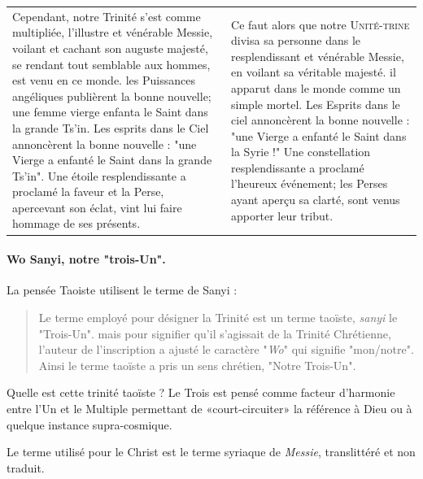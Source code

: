 \begin{tabular}{p{}p{}}
\\
Cependant, notre Trinité s'est comme multipliée, l'illustre et vénérable Messie, voilant et cachant son auguste majesté, se rendant tout semblable aux hommes, est venu en ce monde. les Puissances angéliques publièrent la bonne nouvelle; une femme vierge enfanta le Saint dans la grande Ts'in. Les esprits dans le Ciel annoncèrent la bonne nouvelle : "une Vierge a enfanté le Saint dans la grande Ts'in". Une étoile resplendissante a proclamé la faveur et la Perse, apercevant son éclat, vint lui faire hommage de ses présents. \cite[p. 35]{Havret:stelechretienne} & 

Ce faut alors que notre \textsc{Unité-trine} divisa sa personne dans le resplendissant et vénérable Messie, en voilant sa véritable majesté. il apparut dans le monde comme un simple mortel. Les Esprits dans le ciel annoncèrent la bonne nouvelle : "une Vierge a enfanté le Saint dans la Syrie !"  Une constellation resplendissante a proclamé l'heureux événement; les Perses ayant aperçu sa clarté, sont venus apporter leur tribut. \cite[p. 9]{Pauthier:linscriptionSinganfou} \\
                                                                                  
\end{tabular}
 
 \paragraph{Wo Sanyi, notre "trois-Un". } La pensée Taoiste utilisent le terme de Sanyi :  

\begin{quote} Le terme employé pour désigner la Trinité est un terme taoïste, \emph{sanyi} le "Trois-Un". mais pour signifier qu'il s'agissait de la Trinité Chrétienne, l'auteur de l'inscription a ajusté le caractère "\emph{Wo}" qui signifie "mon/notre". Ainsi le terme taoïste a pris un sens chrétien, "Notre Trois-Un".
    \cite[p.43]{Raguin:JesusMessieXian}
\end{quote}
Quelle est cette trinité taoïste ? Le Trois est pensé comme facteur d'harmonie entre l'Un et le Multiple permettant de «court-circuiter» la référence à Dieu ou à quelque instance supra-cosmique.\cite{Cheng:triadeChinoise}


Le terme utilisé pour le Christ est le terme syriaque de \textit{Messie}, translittéré et non traduit.

